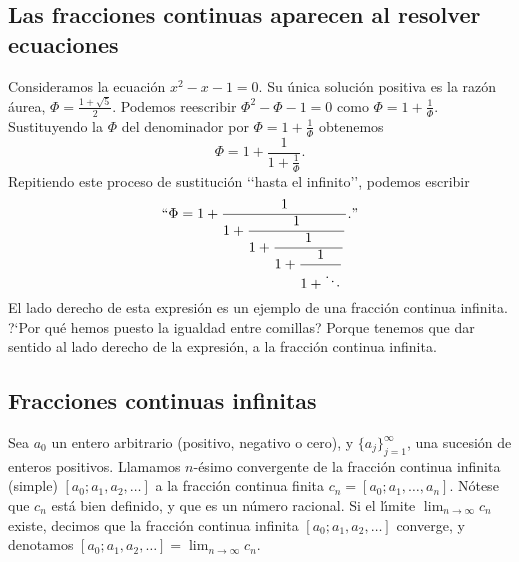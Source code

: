 \subsection{Las fracciones continuas aparecen al resolver ecuaciones }

Consideramos la ecuaci\'on $x^2-x-1=0$. Su \'unica soluci\'on positiva es la
raz\'on \'aurea, $\Phi=\frac{1+\sqrt{5}}2$. Podemos reescribir $\Phi^2-\Phi-1=0$
como $\Phi=1+\frac1\Phi$. Sustituyendo la $\Phi$ del denominador por
$\Phi=1+\frac1\Phi$ obtenemos
$$
\Phi=1+\frac1{1+\frac1\Phi}.
$$
Repitiendo este proceso de sustituci\'on \lq\lq hasta el infinito\rq\rq, podemos
escribir
$$
\text{\lq\lq}\Phi=1+\frac1{1+\displaystyle\frac1{1+\displaystyle\frac1{
1+\displaystyle\frac1{1+\ddots}}}}.\text{\rq\rq}
$$
El lado derecho de esta expresi\'on es un ejemplo de una fracci\'on continua
infinita. ?`Por qu\'e hemos puesto la igualdad entre comillas? Porque tenemos
que dar sentido al lado derecho de la expresi\'on, a la fracci\'on continua
infinita. 


\subsection{Fracciones continuas infinitas} 
Sea $a_0$ un entero arbitrario (positivo, negativo o cero),  y
$\{a_j\}_{j=1}^\infty$, una sucesi\'on de enteros positivos. 
Llamamos $n$-\'esimo convergente de la fracci\'on continua infinita (simple)
$[a_0;a_1,a_2,\dots]$ a la fracci\'on continua finita $c_n=[a_0;a_1,\dots,a_n]$.
N\'otese que $c_n$ est\'a bien definido, y que es un n\'umero racional. Si el
l\'{\i}mite $\lim_{n\to\infty}c_n$ existe, decimos que la fracci\'on continua
infinita $[a_0;a_1,a_2,\dots]$ converge, y denotamos
$[a_0;a_1,a_2,\dots]=\lim_{n\to\infty}c_n$.




